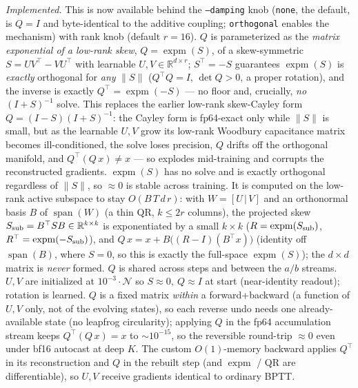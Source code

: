 \documentclass[11pt]{article}
\newcommand{\expm}{\operatorname{expm}}
\newcommand{\code}[1]{\texttt{#1}}
\begin{document}
\emph{Implemented.}  This is now available behind the \code{--damping} knob (\code{none}, the
default, is \(Q{=}I\) and byte-identical to the additive coupling; \code{orthogonal} enables the
mechanism) with rank knob \code{} (default \(r{=}16\)).  \(Q\) is
parameterized as the \emph{matrix exponential of a low-rank skew}, \(Q=\expm(S)\), of a
skew-symmetric \(S=UV^{\top}-VU^{\top}\) with learnable \(U,V\in\mathbb{R}^{d\times r}\);
\(S^{\top}{=}{-}S\) guarantees \(\expm(S)\) is \emph{exactly} orthogonal for \emph{any} \(\|S\|\)
(\(Q^{\top}Q{=}I\), \(\det Q{>}0\), a proper rotation), and the inverse is exactly
\(Q^{\top}=\expm(-S)\) --- no floor and, crucially, \emph{no} \((I+S)^{-1}\) solve.  This replaces
the earlier low-rank skew-Cayley form \(Q=(I-S)(I+S)^{-1}\): the Cayley form is fp64-exact only
while \(\|S\|\) is small, but as the learnable \(U,V\) grow its low-rank Woodbury capacitance matrix
becomes ill-conditioned, the solve loses precision, \(Q\) drifts off the orthogonal manifold, and
\(Q^{\top}(Q\,x)\neq x\) --- so \code{} explodes mid-training and corrupts the
reconstructed gradients.  \(\expm(S)\) has no solve and is exactly orthogonal regardless of \(\|S\|\),
so \code{}\(\approx0\) is stable across training.  It is computed on the
low-rank active subspace to stay \(O(B\,T\,d\,r)\): with \(W=[U\,|\,V]\) and an orthonormal basis
\(B\) of \(\operatorname{span}(W)\) (a thin QR, \(k{\le}2r\) columns), the projected skew
\(S_{\rm sub}=B^{\top}SB\in\mathbb{R}^{k\times k}\) is exponentiated by a small \(k{\times}k\)
\code{} (\(R=\expm(S_{\rm sub})\), \(R^{\top}=\expm(-S_{\rm sub})\)), and
\(Q\,x=x+B\big((R-I)(B^{\top}x)\big)\) (identity off \(\operatorname{span}(B)\), where \(S{=}0\), so
this is exactly the full-space \(\expm(S)\)); the \(d{\times}d\) matrix is \emph{never} formed.  \(Q\)
is shared across steps and between the \(a/b\) streams.  \(U,V\) are initialized at
\(10^{-3}\!\cdot\!\mathcal{N}\) so \(S{\approx}0,\ Q{\approx}I\) at start (near-identity readout);
rotation is learned.  \(Q\) is a fixed matrix \emph{within} a forward+backward (a function of \(U,V\)
only, not of the evolving states), so each reverse undo needs one already-available state (no
leapfrog circularity); applying \(Q\) in the fp64 accumulation stream keeps \(Q^{\top}(Q\,x){=}x\) to
\(\sim\!10^{-15}\), so the reversible round-trip \code{}\(\approx0\) even under
bf16 autocast at deep \(K\).  The custom \(O(1)\)-memory backward applies \(Q^{\top}\) in its
reconstruction and \(Q\) in the rebuilt step (and \(\expm\) / QR are differentiable), so \(U,V\)
receive gradients identical to ordinary BPTT.
\end{document}
